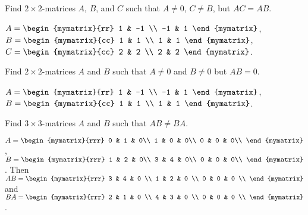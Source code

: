 \begin{ex}
  Find $2\times 2$-matrices $A$, $B$, and $C$ such that
  $A\neq 0$, $C\neq B$,
  but $AC=AB$. 
  \begin{sol}
    $A = \begin{mymatrix}{rr}
      1 & -1 \\
      -1 & 1
    \end{mymatrix}$, $B = \begin{mymatrix}{cc}
      1 & 1 \\
      1 & 1
    \end{mymatrix}$, $C = \begin{mymatrix}{cc}
      2 & 2 \\
      2 & 2
    \end{mymatrix}$. 
  \end{sol}
\end{ex}

\begin{ex}
  Find $2\times 2$-matrices $A$ and $B$ such that $A \neq 0$
  and $B \neq 0$ but $AB = 0$.
  \begin{sol}
    $A = \begin{mymatrix}{rr}
      1 & -1 \\
      -1 & 1
    \end{mymatrix}$, $B = \begin{mymatrix}{cc}
      1 & 1 \\
      1 & 1
    \end{mymatrix}$. 
  \end{sol}
\end{ex}

\begin{ex}
  Find $3 \times 3$-matrices $A$ and $B$ such that $AB \neq BA$.
  \begin{sol}
    $A = \begin{mymatrix}{rrr}
      0 & 1 & 0\\
      1 & 0 & 0\\
      0 & 0 & 0\\
    \end{mymatrix}$, $B = \begin{mymatrix}{rrr}
      1 & 2 & 0\\
      3 & 4 & 0\\
      0 & 0 & 0\\
    \end{mymatrix}$. Then 
    $AB=
    \begin{mymatrix}{rrr}
      3 & 4 & 0 \\
      1 & 2 & 0 \\
      0 & 0 & 0 \\
    \end{mymatrix}$ and $BA = 
    \begin{mymatrix}{rrr}
      2 & 1 & 0 \\
      4 & 3 & 0 \\
      0 & 0 & 0 \\
    \end{mymatrix}$.
  \end{sol}
\end{ex}

